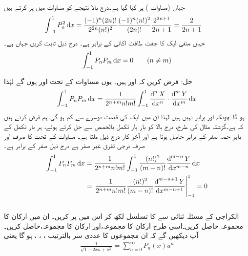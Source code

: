 جہاں   (مساوات ) پر کیا گیا ہے۔درج بالا نتیجے کو مساوات  میں پر کرتے ہیں
 \begin{align}
\int_{-1}^{1} P_n^2  \dif x&=\frac{(-1)^n (2n)!}{2^{2n}(n!)^2}\frac{(-1)^n(n!)^2}{(2n)!}\frac{2^{2n+1}}{2n+1}=\frac{2}{2n+1}
\end{align}
جہاں منفی ایک کا جفت طاقت اکائی کے برابر  ہے۔
درج ذیل ثابت کریں جہاں  ہے۔
\begin{align}
\int_{-1}^{1}P_nP_m \dif x=0\quad \quad (n \ne m)
\end{align}

حل: فرض کریں کہ  اور  ہیں۔ یوں مساوات  کے تحت
  اور    ہوں گے لہٰذا
\begin{align*}
\int_{-1}^{1}P_n P_m \dif x=\frac{1}{2^{n+m}n!m!}\int_{-1}^{1} \frac{\dif^{\,n}X}{\dif x^n}\cdot \frac{\dif^{\,m}Y}{\dif x^m}\dif x
\end{align*}
ہو گا۔چونکہ  اور  برابر نہیں ہیں لہٰذا ان میں ایک کی قیمت دوسرے سے کم ہو گی۔ہم فرض کرتے ہیں کہ  ہے۔گزشتہ مثال کی طرح، درج بالا کو بار بار تکمل بالحصص سے حل کرتے ہوئے، ہر بار تکمل کے باہر حصہ صفر کے برابر حاصل ہوتا ہے اور آخر کار درج ذیل ملتا ہے۔ مساوات  کے تحت  کا صرف اور صرف  درجی تفرق غیر صفر ہے درج ذیل صفر کے برابر ہے۔
\begin{align*}
\int_{-1}^{1}P_nP_m\dif x&=\frac{1}{2^{n+m}n!m!}\int_{-1}^{1} \frac{(n!)^2}{(m-n)!}\frac{\dif^{\,m-n}Y}{\dif x^{m-n}}\dif x\\
&=\left. \frac{1}{2^{n+m}n!m!} \frac{(n!)^2}{(m-n)!}\frac{\dif^{\,m-n+1}Y}{\dif x^{m-n+1}}\right|_{-1}^{1}=0
\end{align*}
\quad {}\\
الکراجی کے مسئلہ ثنائی سے  کا تسلسل لکھ کر اس میں  پر کریں۔ ان میں  ارکان کا مجموعہ حاصل کریں۔اسی طرح   ارکان کا مجموعہ،اور  ارکان کا مجموعہ،  حاصل کریں۔آپ دیکھیں گے کہ ان مجموعوں کا عددی سر بالترتیب ، ، ،  ہو گا یعنی
\begin{align}\label{مساوات_بیسل_پیداکار_تفاعل_لیژانڈر}
\frac{1}{\sqrt{1-2xu+u^2}}=\sum_{n=0}^{\infty}P_n(x)u^n
\end{align}

